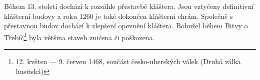 \documentclass[a4paper,oneside,12p]{report}
\let\openright=\clearpage
\begin{document}
Během 13. století dochází k rozsáhle přestavbě kláštera.
Jsou vztyčeny definitivní klášterní budovy a roku 1260 je také dokončen klášterní chrám.
Společně s přestavnou budov dochází k zlepšení opevnění kláštera.
Bohužel během Bitvy o Třebíč\footnote{12. květen — 9. červen 1468, součást česko-uherských válek (Druhá válka husitská)} byla většina staveb zničena či poškozena.

\nocite{Uhlir1978}

















\listoffigures
\openright
\end{document}
